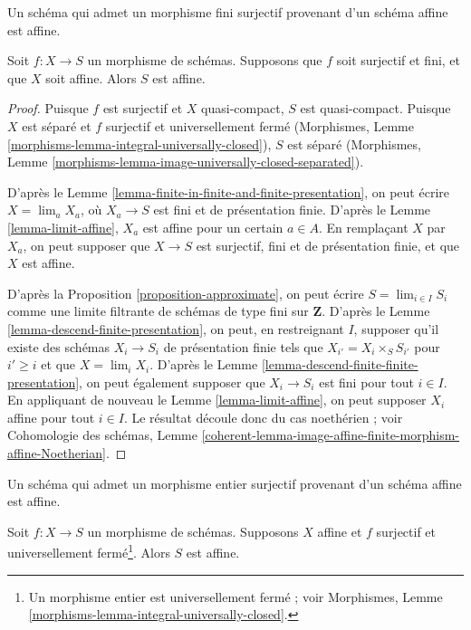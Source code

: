 \begin{lemma}
\label{lemma-affine}
\begin{slogan}
Un schéma qui admet un morphisme fini surjectif provenant d'un schéma affine est affine.
\end{slogan}
Soit $f : X \to S$ un morphisme de schémas.
Supposons que $f$ soit surjectif et fini, et que $X$ soit affine.
Alors $S$ est affine.
\end{lemma}

\begin{proof}
Puisque $f$ est surjectif et $X$ quasi-compact, $S$ est
quasi-compact. Puisque $X$ est séparé et $f$ surjectif et
universellement fermé (Morphismes, Lemme
\ref{morphisms-lemma-integral-universally-closed}), $S$
est séparé (Morphismes, Lemme
\ref{morphisms-lemma-image-universally-closed-separated}).

\medskip\noindent
D'après le Lemme \ref{lemma-finite-in-finite-and-finite-presentation},
on peut écrire $X = \lim_a X_a$, où $X_a \to S$ est fini et de présentation
finie. D'après le Lemme \ref{lemma-limit-affine}, $X_a$
est affine pour un certain $a \in A$. En remplaçant $X$ par $X_a$, on peut supposer
que $X \to S$ est surjectif, fini et de présentation finie, et
que $X$ est affine.

\medskip\noindent
D'après la Proposition \ref{proposition-approximate}, on peut écrire
$S = \lim_{i \in I} S_i$ comme
une limite filtrante de schémas de type fini sur $\mathbf{Z}$.
D'après le Lemme \ref{lemma-descend-finite-presentation}, on peut,
en restreignant $I$, supposer qu'il existe des schémas $X_i \to S_i$
de présentation finie tels que $X_{i'} = X_i \times_S S_{i'}$
pour $i' \geq i$ et que $X = \lim_i X_i$. D'après le
Lemme \ref{lemma-descend-finite-finite-presentation}, on peut
également supposer que $X_i \to S_i$ est fini pour tout $i \in I$.
En appliquant de nouveau le Lemme \ref{lemma-limit-affine}, on peut supposer $X_i$
affine pour tout $i \in I$. Le résultat découle donc du
cas noethérien ; voir Cohomologie des schémas,
Lemme \ref{coherent-lemma-image-affine-finite-morphism-affine-Noetherian}.
\end{proof}

\begin{proposition}
\label{proposition-affine}
\begin{slogan}
Un schéma qui admet un morphisme entier surjectif provenant d'un schéma affine est affine.
\end{slogan}
Soit $f : X \to S$ un morphisme de schémas. Supposons $X$ affine
et $f$ surjectif et universellement fermé\footnote{Un morphisme entier
est universellement fermé ; voir
Morphismes, Lemme \ref{morphisms-lemma-integral-universally-closed}.}.
Alors $S$ est affine.
\end{proposition}

